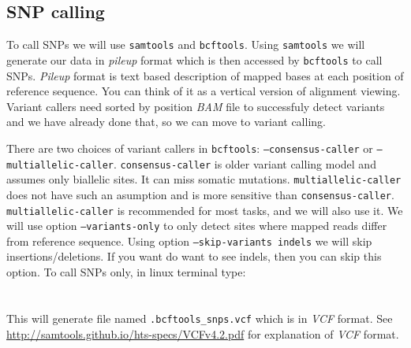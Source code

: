 \subsection{SNP calling}

To call SNPs we will use \texttt{samtools} and \texttt{bcftools}.
Using \texttt{samtools} we will generate our data in \textit{pileup} format which
is then accessed by \texttt{bcftools} to call SNPs.
\textit{Pileup} format is text based description of mapped bases at each position of reference sequence.
You can think of it as a vertical version of alignment viewing.
Variant callers need sorted by position \textit{BAM} file to successfuly detect variants
and we have already done that, so we can move to variant calling.

There are two choices of variant callers in \texttt{bcftools}:
\texttt{--consensus-caller} or \texttt{--multiallelic-caller}. \texttt{consensus-caller} is
older variant calling model and assumes only biallelic sites. It can miss somatic mutations.
\texttt{multiallelic-caller} does not have such an asumption and is more sensitive than \texttt{consensus-caller}.
\texttt{multiallelic-caller} is recommended for most tasks, and we will also use it. 
We will use option \texttt{--variants-only} to only detect sites where mapped reads differ from reference sequence.
Using option \texttt{--skip-variants indels} we will skip insertions/deletions. If you want do want to
see indels, then you can skip this option. To call SNPs only, in linux terminal type:\\~\\
\\

This will generate file named \texttt{\mapReads.bcftools\_snps.vcf} which is in \textit{VCF} format.
See \url{http://samtools.github.io/hts-specs/VCFv4.2.pdf} for explanation of \textit{VCF} format.
